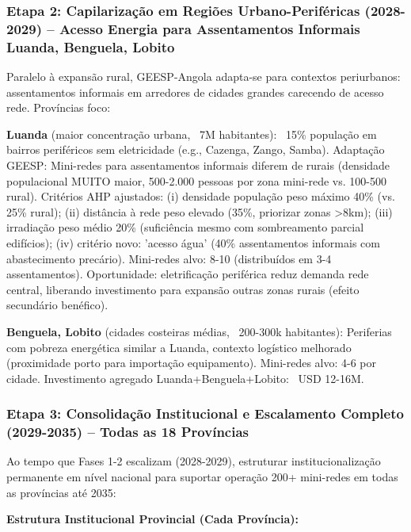\documentclass[12pt, a4paper]{article}
\begin{document}
\subsubsection{Etapa 2: Capilarização em Regiões Urbano-Periféricas (2028-2029) -- Acesso Energia para Assentamentos Informais Luanda, Benguela, Lobito}

Paralelo à expansão rural, GEESP-Angola adapta-se para contextos periurbanos: assentamentos informais em arredores de cidades grandes carecendo de acesso rede. Províncias foco:

\textbf{Luanda} (maior concentração urbana, ~7M habitantes): ~15\% população em bairros periféricos sem eletricidade (e.g., Cazenga, Zango, Samba). Adaptação GEESP: Mini-redes para assentamentos informais diferem de rurais (densidade populacional MUITO maior, 500-2.000 pessoas por zona mini-rede vs. 100-500 rural). Critérios AHP ajustados: (i) densidade população peso máximo 40\% (vs. 25\% rural); (ii) distância à rede peso elevado (35\%, priorizar zonas >8km); (iii) irradiação peso médio 20\% (suficiência mesmo com sombreamento parcial edifícios); (iv) critério novo: 'acesso água' (40\% assentamentos informais com abastecimento precário). Mini-redes alvo: 8-10 (distribuídos em 3-4 assentamentos). Oportunidade: eletrificação periférica reduz demanda rede central, liberando investimento para expansão outras zonas rurais (efeito secundário benéfico).

\textbf{Benguela, Lobito} (cidades costeiras médias, ~200-300k habitantes): Periferias com pobreza energética similar a Luanda, contexto logístico melhorado (proximidade porto para importação equipamento). Mini-redes alvo: 4-6 por cidade. Investimento agregado Luanda+Benguela+Lobito: ~USD 12-16M.

\subsubsection{Etapa 3: Consolidação Institucional e Escalamento Completo (2029-2035) -- Todas as 18 Províncias}

Ao tempo que Fases 1-2 escalizam (2028-2029), estruturar institucionalização permanente em nível nacional para suportar operação 200+ mini-redes em todas as províncias até 2035:

\textbf{Estrutura Institucional Provincial (Cada Província):}
\end{document}
